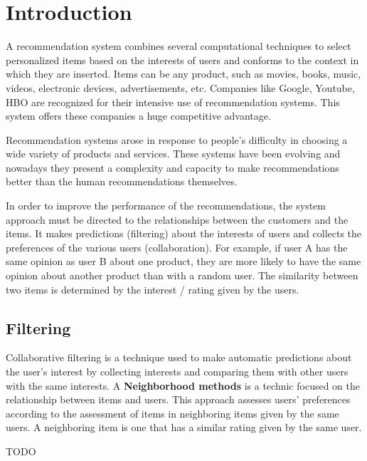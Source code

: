 \section{Introduction}
\label{intro}

A recommendation system combines several computational techniques to select personalized items based on the interests of users and conforms to the context in which they are inserted.
Items can be any product, such as movies, books, music, videos, electronic devices, advertisements, etc.
Companies like Google, Youtube, HBO are recognized for their intensive use of recommendation systems.
This system offers these companies a huge competitive advantage.

Recommendation systems arose in response to people's difficulty in choosing a wide variety of products and services.
These systems have been evolving and nowadays they present a complexity and capacity to make recommendations better than the human recommendations themselves.

In order to improve the performance of the recommendations, the system approach must be directed to the relationships between the customers and the items. 
It makes predictions (filtering) about the interests of users and collects the preferences of the various users (collaboration).
For example, if user A has the same opinion as user B about one product, they are more likely to have the same opinion about another product than with a random user.
The similarity between two items is determined by the interest / rating given by the users.

\subsection{Filtering}

Collaborative filtering is a technique used to make automatic predictions about the user's interest by collecting interests and comparing them with other users with the same interests.
A \textbf{Neighborhood methods} is a technic focused on the relationship between items and users.
This approach assesses users' preferences according to the assessment of items in neighboring items given by the same users.
A neighboring item is one that has a similar rating given by the same user.

TODO